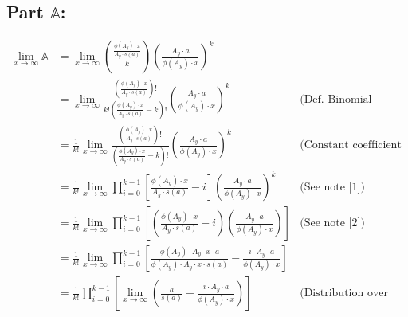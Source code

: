 \documentclass{article}
\theoremstyle{definition}
\begin{document}
\subsection*{Part $\mathbb{A}$:}
\begin{align*}
    \lim_{x \to \infty}\mathbb{A} & = \lim_{x \to \infty}{\frac{\phi(A_y) \cdot x}{A_y \cdot s(a)} \choose k } \left(\frac{A_y \cdot a}{\phi(A_y) \cdot x}\right)^k                                                                                                                                     \\
                                  & = \lim_{x \to \infty} \frac{\left(\frac{\phi(A_y) \cdot x}{A_y \cdot s(a)}\right)!}{k!\left(\frac{\phi(A_y) \cdot x}{A_y \cdot s(a)} - k \right)!} \left(\frac{A_y \cdot a}{\phi(A_y) \cdot x}\right)^k           & \text{(Def. Binomial Coefficient)}              \\
                                  & = \frac{1}{k!}\lim_{x \to \infty} \frac{\left(\frac{\phi(A_y) \cdot x}{A_y \cdot s(a)}\right)!}{\left(\frac{\phi(A_y) \cdot x}{A_y \cdot s(a)} - k \right)!} \left(\frac{A_y \cdot a}{\phi(A_y) \cdot x}\right)^k & \text{(Constant coefficient limit law)}         \\
                                  & = \frac{1}{k!}\lim_{x \to \infty} \prod_{i = 0}^{k-1} \left[\frac{\phi(A_y) \cdot x}{A_y \cdot s(a)} - i \right ]\left(\frac{A_y \cdot a}{\phi(A_y) \cdot x}\right)^k                                             & \text{(See note [1])}                           \\
                                  & = \frac{1}{k!}\lim_{x \to \infty} \prod_{i = 0}^{k-1} \left[\left(\frac{\phi(A_y) \cdot x}{A_y \cdot s(a)} - i\right)\left(\frac{A_y \cdot a}{\phi(A_y) \cdot x}\right) \right]                                   & \text{(See note [2])}                           \\
                                  & = \frac{1}{k!}\lim_{x \to \infty} \prod_{i = 0}^{k-1} \left[\frac{\phi(A_y) \cdot A_y  \cdot x \cdot a}{ \phi(A_y) \cdot A_y \cdot   x \cdot s(a)} - \frac{i \cdot A_y \cdot a }{\phi(A_y) \cdot x}  \right]                                                        \\
                                  & = \frac{1}{k!} \prod_{i = 0}^{k-1} \left[\lim_{x \to \infty} \left(   \frac{a}{ s(a)} - \frac{i \cdot A_y \cdot a }{\phi(A_y) \cdot x} \right) \right]                                                            & \text{(Distribution over product limit law)}    \\

\end{align*}
\end{document}
